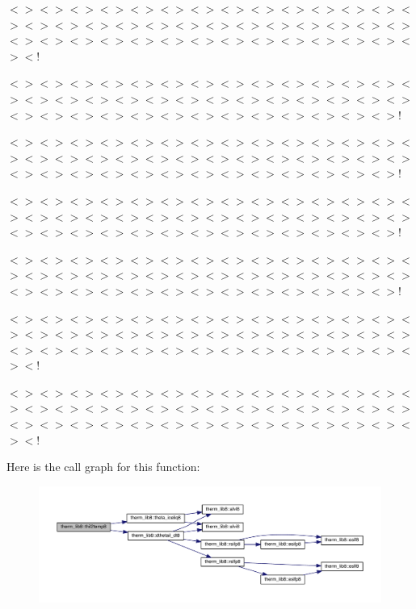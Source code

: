 $<$$>$$<$$>$$<$$>$$<$$>$$<$$>$$<$$>$$<$$>$$<$$>$$<$$>$$<$$>$$<$$>$$<$$>$$<$$>$$<$$>$$<$$>$$<$$>$$<$$>$$<$$>$$<$$>$$<$$>$$<$$>$$<$$>$$<$$>$$<$$>$$<$$>$$<$$>$$<$$>$$<$$>$$<$$>$$<$$>$$<$$>$$<$$>$$<$$>$$<$$>$$<$$>$$<$$>$$<$$>$$<$$>$$<$$>$$<$$>$$<$$>$$<$!

$<$$>$$<$$>$$<$$>$$<$$>$$<$$>$$<$$>$$<$$>$$<$$>$$<$$>$$<$$>$$<$$>$$<$$>$$<$$>$$<$$>$$<$$>$$<$$>$$<$$>$$<$$>$$<$$>$$<$$>$$<$$>$$<$$>$$<$$>$$<$$>$$<$$>$$<$$>$$<$$>$$<$$>$$<$$>$$<$$>$$<$$>$$<$$>$$<$$>$$<$$>$$<$$>$$<$$>$$<$$>$$<$$>$$<$$>$$<$$>$!

$<$$>$$<$$>$$<$$>$$<$$>$$<$$>$$<$$>$$<$$>$$<$$>$$<$$>$$<$$>$$<$$>$$<$$>$$<$$>$$<$$>$$<$$>$$<$$>$$<$$>$$<$$>$$<$$>$$<$$>$$<$$>$$<$$>$$<$$>$$<$$>$$<$$>$$<$$>$$<$$>$$<$$>$$<$$>$$<$$>$$<$$>$$<$$>$$<$$>$$<$$>$$<$$>$$<$$>$$<$$>$$<$$>$$<$$>$$<$$>$!

$<$$>$$<$$>$$<$$>$$<$$>$$<$$>$$<$$>$$<$$>$$<$$>$$<$$>$$<$$>$$<$$>$$<$$>$$<$$>$$<$$>$$<$$>$$<$$>$$<$$>$$<$$>$$<$$>$$<$$>$$<$$>$$<$$>$$<$$>$$<$$>$$<$$>$$<$$>$$<$$>$$<$$>$$<$$>$$<$$>$$<$$>$$<$$>$$<$$>$$<$$>$$<$$>$$<$$>$$<$$>$$<$$>$$<$$>$$<$$>$!

$<$$>$$<$$>$$<$$>$$<$$>$$<$$>$$<$$>$$<$$>$$<$$>$$<$$>$$<$$>$$<$$>$$<$$>$$<$$>$$<$$>$$<$$>$$<$$>$$<$$>$$<$$>$$<$$>$$<$$>$$<$$>$$<$$>$$<$$>$$<$$>$$<$$>$$<$$>$$<$$>$$<$$>$$<$$>$$<$$>$$<$$>$$<$$>$$<$$>$$<$$>$$<$$>$$<$$>$$<$$>$$<$$>$$<$$>$$<$$>$!

$<$$>$$<$$>$$<$$>$$<$$>$$<$$>$$<$$>$$<$$>$$<$$>$$<$$>$$<$$>$$<$$>$$<$$>$$<$$>$$<$$>$$<$$>$$<$$>$$<$$>$$<$$>$$<$$>$$<$$>$$<$$>$$<$$>$$<$$>$$<$$>$$<$$>$$<$$>$$<$$>$$<$$>$$<$$>$$<$$>$$<$$>$$<$$>$$<$$>$$<$$>$$<$$>$$<$$>$$<$$>$$<$$>$$<$$>$$<$$>$$<$$>$$<$!

$<$$>$$<$$>$$<$$>$$<$$>$$<$$>$$<$$>$$<$$>$$<$$>$$<$$>$$<$$>$$<$$>$$<$$>$$<$$>$$<$$>$$<$$>$$<$$>$$<$$>$$<$$>$$<$$>$$<$$>$$<$$>$$<$$>$$<$$>$$<$$>$$<$$>$$<$$>$$<$$>$$<$$>$$<$$>$$<$$>$$<$$>$$<$$>$$<$$>$$<$$>$$<$$>$$<$$>$$<$$>$$<$$>$$<$$>$$<$$>$$<$$>$$<$! 

Here is the call graph for this function\+:\nopagebreak
\begin{figure}[H]
\begin{center}
\leavevmode
\includegraphics[width=350pt]{namespacetherm__lib8_a7d009d0d3507e656b58c9eb70c747598_cgraph}
\end{center}
\end{figure}


